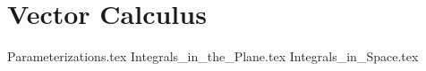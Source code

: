 \section{Vector Calculus}

{Parameterizations.tex}
{Integrals_in_the_Plane.tex}
{Integrals_in_Space.tex}